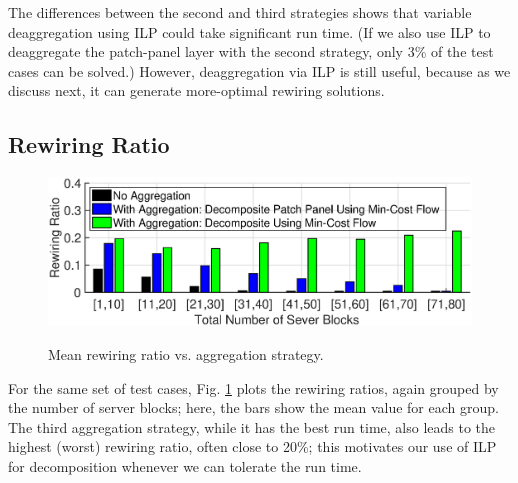 \documentclass[letterpaper,twocolumn,10pt]{article}
\begin{document}
The differences between the second and third strategies shows that variable deaggregation using ILP could take significant run time. (If we also use ILP to deaggregate the patch-panel layer with the second strategy, only 3\% of the test cases can be solved.)  However, deaggregation via ILP is still useful, because as we discuss next, it can generate more-optimal rewiring solutions.

\subsection{Rewiring Ratio}\label{rewireratiosection}
\begin{figure}[ht]
  \centering
  \includegraphics[scale=0.32]{incremental_rewire_ratio}\\  %
\vspace{-1ex}
  \caption{Mean rewiring ratio vs. aggregation strategy.}\label{incremental_rewire_ratio}
\end{figure}

For the same set of test cases, Fig. \ref{incremental_rewire_ratio} plots the rewiring ratios, again grouped by the number of server blocks; here, the bars show the mean value for each group. The third aggregation strategy, while it has the best run time, also leads to the highest (worst) rewiring ratio, often close to 20\%; this motivates our use of ILP for decomposition whenever we can tolerate the run time.

\end{document}
